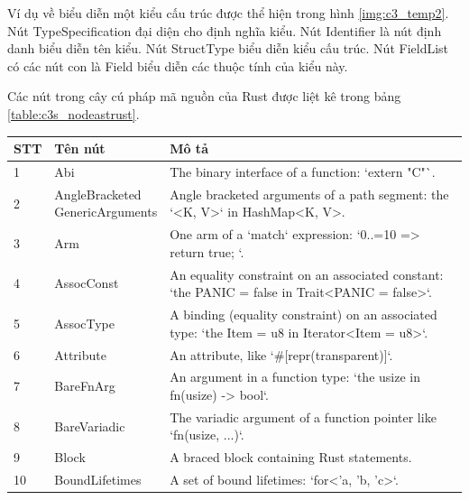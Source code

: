 Ví dụ về biểu diễn một kiểu cấu trúc được thể hiện trong hình \ref{img:c3_temp2}.
Nút TypeSpecification đại diện cho định nghĩa kiểu.
Nút Identifier là nút định danh biểu diễn tên kiểu.
Nút StructType biểu diễn kiểu cấu trúc.
Nút FieldList có các nút con là Field biểu diễn các thuộc tính của kiểu này.

Các nút trong cây cú pháp mã nguồn của Rust được liệt kê trong bảng \ref{table:c3s_nodeastrust}.

\footnotesize
\begin{longtable}{| p{} | p{} | p{} |}
\hline
\textbf{STT} & \textbf{Tên nút} & \textbf{Mô tả} \\ \hline
1     & Abi                            & The binary interface of a function: `extern "C"`.                                                              \\ \hline
2     & \makecell{AngleBracketed \\ GenericArguments} & Angle bracketed arguments of a path segment: the `<K, V>` in HashMap<K, V>.                                    \\ \hline
3     & Arm                            & One arm of a `match` expression: `0..=10 => { return true; }`.                                                 \\ \hline
4     & AssocConst                     & An equality constraint on an associated constant: `the PANIC = false in Trait<PANIC = false>`.                 \\ \hline
5     & AssocType                      & A binding (equality constraint) on an associated type: `the Item = u8 in Iterator<Item = u8>`.                 \\ \hline
6     & Attribute                      & An attribute, like `\#[repr(transparent)]`.                                                                     \\ \hline
7     & BareFnArg                      & An argument in a function type: `the usize in fn(usize) -> bool`.                                              \\ \hline
8     & BareVariadic                   & The variadic argument of a function pointer like `fn(usize, ...)`.                                             \\ \hline
9     & Block                          & A braced block containing Rust statements.                                                                     \\ \hline
10    & BoundLifetimes                 & A set of bound lifetimes: `for<'a, 'b, 'c>`.                                                                   \\ \hline

\end{longtable}
